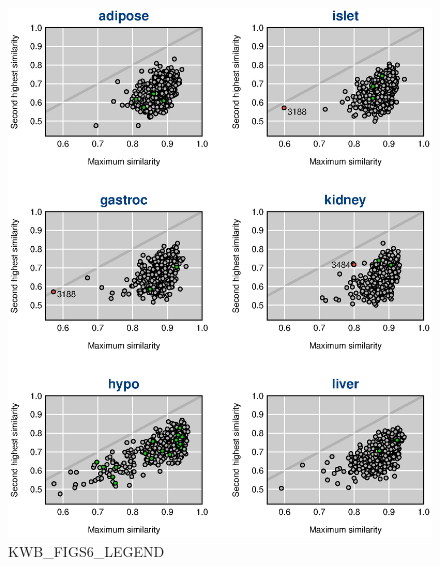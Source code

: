 \documentclass[letterpaper,twoside]{article}
\begin{document}
\begin{figure}[p]
\centerline{\includegraphics{SuppFigs/figS6.eps}}

\caption{KWB_FIGS6_LEGEND}
\end{figure}


\clearpage
\end{document}

